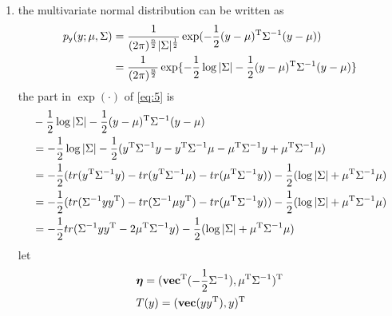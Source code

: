 \documentclass[a4paper]{article}
\begin{document}
{\begin{enumerate}
\begin{enumerate}
\begin{proof}
\begin{equation*}
\begin{aligned}
        \hat{P}_{\rvy}(l) &= \frac1m \sum_{i=1}^m P(y^{(i)}=l|x^{(i)};\theta,b) 
            \sum_{j=1}^m \1\{x^{(i)}=x^{(j)}\} \\
        \hat{P}_{\rvy}(l) &= \sum_{x\in \mathcal{X}} P_{\rvy|\rvx}(l|x)\hat{P}_{\rvx}(x) 
        \end{aligned}
        \end{equation*}
    \end{proof}
\end{enumerate}
    \item the multivariate normal distribution can be written as 
    \begin{equation}
    \begin{aligned}
    p_{\mathsf{y}}(y;\mu,\Sigma) &= \frac1{(2\pi)^{\frac{n}2}|\Sigma|^{\frac12}} 
        \exp(-\frac12(y-\mu)^{\mathrm{T}}\Sigma^{-1}(y-\mu)) \\ 
      &= \frac1{(2\pi)^{\frac{n}2}} \exp\{ -\frac12\log|\Sigma| -\frac12(y-\mu)^{\mathrm{T}}\Sigma^{-1}(y-\mu)\} \\
    \end{aligned}
    \label{eq:5}
    \end{equation}
    the part in $\exp(\cdot)$ of \eqref{eq:5} is
    \begin{equation}
    \begin{aligned}
    &-\frac12\log|\Sigma| -\frac12(y-\mu)^{\mathrm{T}}\Sigma^{-1}(y-\mu) \\
    &= -\frac12\log|\Sigma| - \frac12(y^{\mathrm{T}}\Sigma^{-1}y-y^{\mathrm{T}}\Sigma^{-1}\mu-\mu^{\mathrm{T}}\Sigma^{-1}y
        + \mu^{\mathrm{T}}\Sigma^{-1}\mu) \\
    &= -\frac12(tr(y^{\mathrm{T}}\Sigma^{-1}y)-tr(y^{\mathrm{T}}\Sigma^{-1}\mu)-tr(\mu^{\mathrm{T}}\Sigma^{-1}y) )
        -\frac12(\log|\Sigma| + \mu^{\mathrm{T}}\Sigma^{-1}\mu) \\
    &= -\frac12(tr(\Sigma^{-1}yy^{\mathrm{T}})-tr(\Sigma^{-1}\mu y^{\mathrm{T}})-tr(\mu^{\mathrm{T}}\Sigma^{-1}y) )
        -\frac12(\log|\Sigma| + \mu^{\mathrm{T}}\Sigma^{-1}\mu) \\
    &= -\frac12tr(\Sigma^{-1}yy^{\mathrm{T}}-2\mu^{\mathrm{T}}\Sigma^{-1}y)
        -\frac12(\log|\Sigma| + \mu^{\mathrm{T}}\Sigma^{-1}\mu) 
    \end{aligned}
    \label{eq:6}
    \end{equation}
    let 
    \begin{equation}
    \begin{align}
    &\bm{\eta} = (\vecf^{\T}(-\frac12\Sigma^{-1}),\mu^{\T}\Sigma^{-1})^{\T} \\
    &T(y) = (\vecf(yy^{\T}),y)^{\T}
    \end{align}

\end{equation}
\end{enumerate}}
\end{document}
